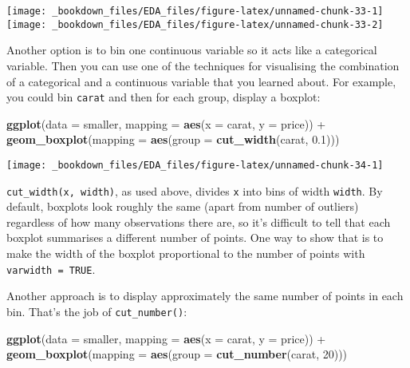 \documentclass[]{book}
\newenvironment{Shaded}{\begin{snugshade}}{\end{snugshade}}
\newcommand{\KeywordTok}[1]{\textcolor[rgb]{0.13,0.29,0.53}{\textbf{{#1}}}}
\newcommand{\DataTypeTok}[1]{\textcolor[rgb]{0.13,0.29,0.53}{{#1}}}
\newcommand{\DecValTok}[1]{\textcolor[rgb]{0.00,0.00,0.81}{{#1}}}
\newcommand{\FloatTok}[1]{\textcolor[rgb]{0.00,0.00,0.81}{{#1}}}
\newcommand{\StringTok}[1]{\textcolor[rgb]{0.31,0.60,0.02}{{#1}}}
\newcommand{\NormalTok}[1]{{#1}}
\begin{document}
\texttt{[image: \_bookdown\_files/EDA\_files/figure-latex/unnamed-chunk-33-1]}
\texttt{[image: \_bookdown\_files/EDA\_files/figure-latex/unnamed-chunk-33-2]}

Another option is to bin one continuous variable so it acts like a
categorical variable. Then you can use one of the techniques for
visualising the combination of a categorical and a continuous variable
that you learned about. For example, you could bin \texttt{carat} and
then for each group, display a boxplot:

\begin{Shaded}
\begin{Highlighting}[]
\KeywordTok{ggplot}\NormalTok{(}\DataTypeTok{data =} \NormalTok{smaller, }\DataTypeTok{mapping =} \KeywordTok{aes}\NormalTok{(}\DataTypeTok{x =} \NormalTok{carat, }\DataTypeTok{y =} \NormalTok{price)) +}\StringTok{ }
\StringTok{  }\KeywordTok{geom_boxplot}\NormalTok{(}\DataTypeTok{mapping =} \KeywordTok{aes}\NormalTok{(}\DataTypeTok{group =} \KeywordTok{cut_width}\NormalTok{(carat, }\FloatTok{0.1}\NormalTok{)))}
\end{Highlighting}
\end{Shaded}

\begin{center}\texttt{[image: \_bookdown\_files/EDA\_files/figure-latex/unnamed-chunk-34-1]} \end{center}

\texttt{cut\_width(x,\ width)}, as used above, divides \texttt{x} into
bins of width \texttt{width}. By default, boxplots look roughly the same
(apart from number of outliers) regardless of how many observations
there are, so it's difficult to tell that each boxplot summarises a
different number of points. One way to show that is to make the width of
the boxplot proportional to the number of points with
\texttt{varwidth\ =\ TRUE}.

Another approach is to display approximately the same number of points
in each bin. That's the job of \texttt{cut\_number()}:

\begin{Shaded}
\begin{Highlighting}[]
\KeywordTok{ggplot}\NormalTok{(}\DataTypeTok{data =} \NormalTok{smaller, }\DataTypeTok{mapping =} \KeywordTok{aes}\NormalTok{(}\DataTypeTok{x =} \NormalTok{carat, }\DataTypeTok{y =} \NormalTok{price)) +}\StringTok{ }
\StringTok{  }\KeywordTok{geom_boxplot}\NormalTok{(}\DataTypeTok{mapping =} \KeywordTok{aes}\NormalTok{(}\DataTypeTok{group =} \KeywordTok{cut_number}\NormalTok{(carat, }\DecValTok{20}\NormalTok{)))}
\end{Highlighting}
\end{Shaded}
\end{document}
